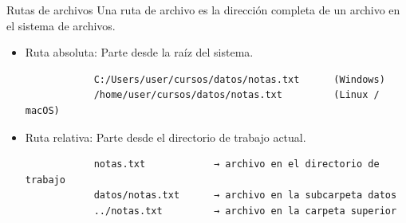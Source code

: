 \documentclass{beamer}
\begin{document}
    \begin{frame}[fragile, t]{Rutas de archivos}
        Una ruta de archivo es la dirección completa de un archivo en el sistema de archivos.
        \begin{itemize}
            \item Ruta absoluta: Parte desde la raíz del sistema.
            \begin{verbatim}
            C:/Users/user/cursos/datos/notas.txt      (Windows)
            /home/user/cursos/datos/notas.txt         (Linux / macOS)
            \end{verbatim}
            \pause
            \item Ruta relativa: Parte desde el directorio de trabajo actual.
            \begin{verbatim}
            notas.txt            → archivo en el directorio de trabajo
            datos/notas.txt      → archivo en la subcarpeta datos
            ../notas.txt         → archivo en la carpeta superior
            \end{verbatim}
        \end{itemize}
    \end{frame}
\end{document}
